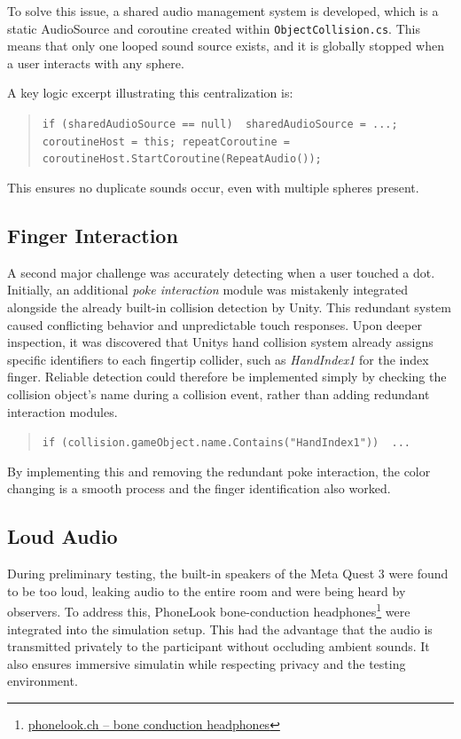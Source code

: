 To solve this issue, a shared audio management system is developed, which is a static AudioSource and coroutine created within \texttt{ObjectCollision.cs}. This means that only one looped sound source exists, and it is globally stopped when a user interacts with any sphere.

A key logic excerpt illustrating this centralization is:

\begin{quote} \small \texttt{if (sharedAudioSource == null) { sharedAudioSource = ...; coroutineHost = this; repeatCoroutine = coroutineHost.StartCoroutine(RepeatAudio());}} \end{quote}

This ensures no duplicate sounds occur, even with multiple spheres present.

\subsection{Finger Interaction} 
A second major challenge was accurately detecting when a user touched a dot. Initially, an additional \textit{poke interaction} module was mistakenly integrated alongside the already built-in collision detection by Unity. This redundant system caused conflicting behavior and unpredictable touch responses. Upon deeper inspection, it was discovered that Unitys hand collision system already assigns specific identifiers to each fingertip collider, such as \textit{HandIndex1} for the index finger. Reliable detection could therefore be implemented simply by checking the collision object's name during a collision event, rather than adding redundant interaction modules.

\begin{quote} \small \texttt{if (collision.gameObject.name.Contains("HandIndex1")) { ... }} \end{quote}

By implementing this and removing the redundant poke interaction, the color changing is a smooth process and the finger identification also worked.

\subsection{Loud Audio} 
During preliminary testing, the built-in speakers of the Meta Quest 3 were found to be too loud, leaking audio to the entire room and were being heard by observers. To address this, PhoneLook bone-conduction headphones\footnote{\href{https://www.phonelook.ch/de/stylische-kabellose-bluetooth-knochenleitungs-kopfhorer-fur-sport-laufen-radfahren-fitness-schwarz.html}{phonelook.ch – bone conduction headphones}} were integrated into the simulation setup. This had the advantage that the audio is transmitted privately to the participant without occluding ambient sounds.
It also ensures immersive simulatin while respecting privacy and the testing environment.

